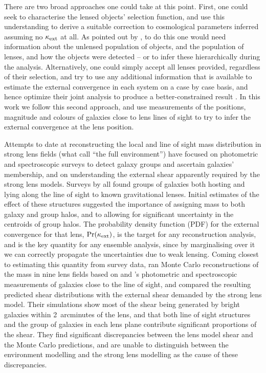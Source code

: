 \documentclass[useAMS,usenatbib]{mn2e}
\begin{document}
There are two broad approaches one could take at this point. First, one could
seek to characterise the lensed objects' selection function, and use this
understanding to derive a suitable correction to cosmological parameters
inferred assuming no $\kappa_{\rm ext}$ at all. As pointed out by  \citet[][among
others]{Oguri+Takahashi2006}, to do this one would need  information about the
unlensed population of objects, and the population of lenses, and how the
objects were detected -- or to infer these hierarchically during the analysis.
Alternatively, one could simply accept all lenses provided, regardless of
their selection, and try to use any additional information that is available
to estimate the external convergence in each system on a case by case basis,
and hence optimize their joint analysis to produce a better-constrained result
\citep[as suggested by][]{Keeton+Zabludoff2004}. In this work we follow this
second approach, and use measurements of the positions, magnitude and colours
of galaxies close to lens lines of sight to try to infer the
external convergence at the lens position. 

Attempts to date at reconstructing the local and  line of sight mass
distribution in strong lens fields (what \citeauthor{WongEtal2011} call ``the
full environment'') have focused on photometric and  spectroscopic surveys to
detect galaxy groups and ascertain galaxies' membership,  and on understanding
the external shear apparently required by the strong lens models. Surveys by
\citet{Fassnacht+Lubin2002,AugerEtal2007,WilliamsEtal2006,MomchevaEtal2006}
all found groups of galaxies both hosting and lying  along the line of sight
to known gravitational lenses. Initial estimates of the effect of these
structures suggested the importance of assigning mass to both galaxy and group
halos, and to allowing for significant uncertainty in the centroids of group
halos. The probability density function (PDF) for the external convergence for
that lens, ${\rm Pr}(\kappa_{\rm ext})$, is the target for any reconstruction analysis, and
is the key quantity for any ensemble analysis, since by marginalising over it
we can correctly propagate the uncertainties due to weak lensing. Coming
closest to estimating this quantity from survey data, \citet{WongEtal2011} ran
Monte Carlo reconstructions of the mass in nine lens fields based on
\citeauthor{WilliamsEtal2006} and \citeauthor{MomchevaEtal2006}'s
photometric and spectroscopic measurements of galaxies close to the line of
sight, and compared the resulting predicted shear distributions with the
external shear demanded by the strong lens model. Their simulations show most
of the shear being generated by bright galaxies within 2~arcminutes of the
lens, and that both line of sight structures and the group of galaxies in each
lens plane contribute significant proportions of the shear. They find
significant discrepancies between the lens model shear and the Monte Carlo
predictions, and are unable to distinguish between the environment modelling
and the strong lens modelling as the cause of these discrepancies.
\end{document}
